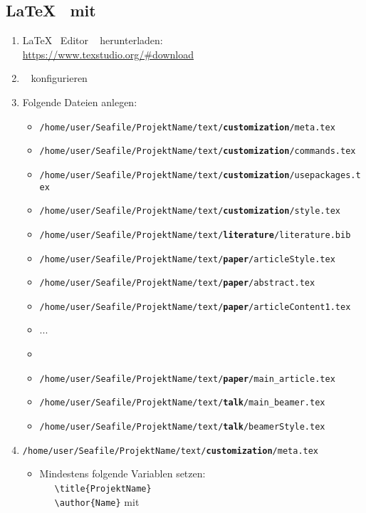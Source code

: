 \subsection{\LaTeX~ mit \texstudio}
\begin{enumerate}
	\item \LaTeX~ Editor \texstudio~ herunterladen: \\\url{https://www.texstudio.org/#download}
	\item \texstudio~ konfigurieren
	\item Folgende Dateien anlegen:
	\begin{itemize}
		\item \texttt{/home/user/Seafile/ProjektName/text/\textbf{customization}/meta.tex}
		\item \texttt{/home/user/Seafile/ProjektName/text/\textbf{customization}/commands.tex}
		\item \texttt{/home/user/Seafile/ProjektName/text/\textbf{customization}/usepackages.tex}
		\item \texttt{/home/user/Seafile/ProjektName/text/\textbf{customization}/style.tex}
		\item \texttt{/home/user/Seafile/ProjektName/text/\textbf{literature}/literature.bib}
		\item \texttt{/home/user/Seafile/ProjektName/text/\textbf{paper}/articleStyle.tex}
		\item \texttt{/home/user/Seafile/ProjektName/text/\textbf{paper}/abstract.tex}
		\item \texttt{/home/user/Seafile/ProjektName/text/\textbf{paper}/articleContent1.tex}
		\item ...
		\item \item \texttt{/home/user/Seafile/ProjektName/text/\textbf{paper}/main\_article.tex}
		\item \texttt{/home/user/Seafile/ProjektName/text/\textbf{talk}/main\_beamer.tex}
		\item \texttt{/home/user/Seafile/ProjektName/text/\textbf{talk}/beamerStyle.tex}
	\end{itemize}
	\item \texttt{/home/user/Seafile/ProjektName/text/\textbf{customization}/meta.tex}
	\begin{itemize}
		\item Mindestens folgende Variablen setzen: \\
		~~~\texttt{\textbackslash title\{ProjektName\}}\\
		~~~\texttt{\textbackslash author\{Name\}} mit \\

\end{itemize}
\end{enumerate}
